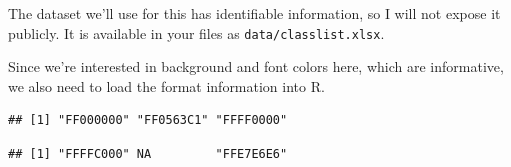 \documentclass[12pt,letterpaperpaper,openany]{book}
\newenvironment{Shaded}{\begin{snugshade}}{\end{snugshade}}
\newcommand{\KeywordTok}[1]{\textcolor[rgb]{0.13,0.29,0.53}{\textbf{#1}}}
\newcommand{\NormalTok}[1]{#1}
\newcommand{\OperatorTok}[1]{\textcolor[rgb]{0.81,0.36,0.00}{\textbf{#1}}}
\newcommand{\StringTok}[1]{\textcolor[rgb]{0.31,0.60,0.02}{#1}}
\begin{document}
The dataset we'll use for this has identifiable information, so I will not expose
it publicly. It is available in your files as \texttt{data/classlist.xlsx}.

Since we're interested in background and font colors here, which are informative,
we also need to load the format information into R.

\begin{Shaded}
\end{Shaded}

\begin{Shaded}
\end{Shaded}

\begin{verbatim}
## [1] "FF000000" "FF0563C1" "FFFF0000"
\end{verbatim}

\begin{Shaded}
\end{Shaded}

\begin{verbatim}
## [1] "FFFFC000" NA         "FFE7E6E6"
\end{verbatim}
\end{document}
